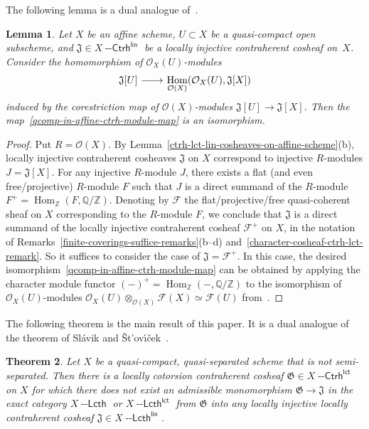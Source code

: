 \documentclass[12pt,a4paper]{amsart}
\newcommand{\+}{\nobreakdash-}
\renewcommand{\:}{\colon}
\newcommand{\rarrow}{\longrightarrow}
\newcommand{\ot}{\otimes}
\newcommand{\lrarrow}{\mskip.5\thinmuskip\relbar\joinrel\relbar
   \joinrel\rightarrow\mskip.5\thinmuskip\relax}
\DeclareMathOperator{\Hom}{Hom}
\newcommand{\Ctrh}{{\operatorname{\mathsf{--Ctrh}}}}
\newcommand{\Lcth}{{\operatorname{\mathsf{--Lcth}}}}
\newcommand{\lct}{\mathsf{lct}}
\newcommand{\lin}{\mathsf{lin}}
\newcommand{\cO}{\mathcal O}
\newcommand{\cF}{\mathcal F}
\newcommand{\fG}{\mathfrak G}
\newcommand{\fJ}{\mathfrak J}
\newcommand{\boQ}{\mathbb Q}
\newcommand{\boZ}{\mathbb Z}
\theoremstyle{plain}
\newtheorem{thm}{Theorem}[section]
\newtheorem{lem}[thm]{Lemma}
\theoremstyle{definition}
\begin{document}
 The following lemma is a dual analogue of~\cite[Lemma~2.1]{SS}.

\begin{lem} \label{slavik-stovicek-lemma}
 Let $X$ be an affine scheme, $U\subset X$ be a quasi-compact open
subscheme, and\/ $\fJ\in X\Ctrh^\lin$ be a locally injective
contraherent cosheaf on~$X$.
 Consider the homomorphism of\/ $\cO_X(U)$\+modules
\begin{equation} \label{qcomp-in-affine-ctrh-module-map}
 \fJ[U]\lrarrow\Hom_{\cO(X)}(\cO_X(U),\fJ[X])
\end{equation}
induced by the corestriction map of\/ $\cO(X)$\+modules\/
$\fJ[U]\rarrow\fJ[X]$.
 Then the map~\eqref{qcomp-in-affine-ctrh-module-map} is
an isomorphism.
\end{lem}

\begin{proof}
 Put $R=\cO(X)$.
 By Lemma~\ref{ctrh-lct-lin-cosheaves-on-affine-scheme}(b),
locally injective contraherent cosheaves $\fJ$ on $X$ correspond to
injective $R$\+modules $J=\fJ[X]$.
 For any injective $R$\+module $J$, there exists a flat (and even
free/projective) $R$\+module $F$ such that $J$ is a direct summand of
the $R$\+module $F^+=\Hom_\boZ(F,\boQ/\boZ)$.
 Denoting by $\cF$ the flat/projective/free quasi-coherent sheaf on
$X$ corresponding to the $R$\+module $F$, we conclude that $\fJ$ is
a direct summand of the locally injective contraherent cosheaf $\cF^+$
on $X$, in the notation of
Remarks~\ref{finite-coverings-suffice-remarks}(b\+-d)
and~\ref{character-cosheaf-ctrh-lct-remark}.
 So it suffices to consider the case of $\fJ=\cF^+$.
 In this case, the desired
isomorphism~\eqref{qcomp-in-affine-ctrh-module-map} can be obtained
by applying the character module functor
$({-})^+=\Hom_\boZ({-},\boQ/\boZ)$ to the isomorphism of
$\cO_X(U)$\+modules $\cO_X(U)\ot_{\cO(X)}\cF(X)\simeq\cF(U)$
from~\cite[Lemma~2.1]{SS}.
\end{proof}

 The following theorem is the main result of this paper.
 It is a dual analogue of the theorem of Sl\'avik
and \v St\!'ov\'\i\v cek~\cite[Theorem~2.2]{SS}.

\begin{thm} \label{non-ssep-not-enough-lin-theorem}
 Let $X$ be a quasi-compact, quasi-separated scheme that is \emph{not}
semi-separated.
 Then there is a locally cotorsion contraherent cosheaf\/
$\fG\in X\Ctrh^\lct$ on $X$ for which there \emph{does not exist}
an admissible monomorphism\/ $\fG\rarrow\fJ$ in the exact category
$X\Lcth$ or $X\Lcth^\lct$ from\/ $\fG$ into any locally injective
locally contraherent cosheaf\/ $\fJ\in X\Lcth^\lin$.
\end{thm}
\end{document}
